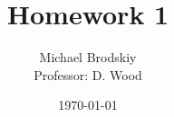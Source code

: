 


\title{Homework 1}
\date{\today}
\author{Michael Brodskiy\\ \small Professor: D. Wood}



\maketitle

